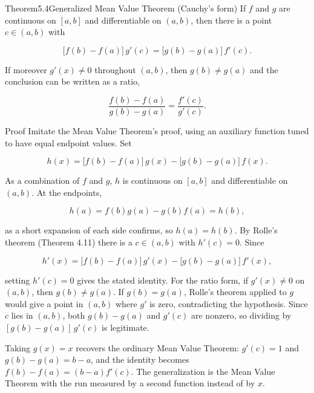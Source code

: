 \documentclass[a4paper,12pt,oneside]{memoir}
\begin{document}
\begin{envtheorem}{Theorem}{5.4}{Generalized Mean Value Theorem (Cauchy’s form)}
If \(f\) and \(g\) are continuous on \([a, b]\) and differentiable on \((a, b)\), then there is a point \(c \in (a, b)\) with

\[ \bigl[f(b) - f(a)\bigr]\,g'(c) = \bigl[g(b) - g(a)\bigr]\,f'(c). \]

If moreover \(g'(x) \ne 0\) throughout \((a, b)\), then \(g(b) \ne g(a)\) and the conclusion can be written as a ratio,

\[ \frac{f(b) - f(a)}{g(b) - g(a)} = \frac{f'(c)}{g'(c)}. \]
\end{envtheorem}
\begin{envproof}{Proof}{}{}
Imitate the Mean Value Theorem’s proof, using an auxiliary function tuned to have equal endpoint values. Set

\[ h(x) = \bigl[f(b) - f(a)\bigr]\,g(x) - \bigl[g(b) - g(a)\bigr]\,f(x). \]

As a combination of \(f\) and \(g\), \(h\) is continuous on \([a, b]\) and differentiable on \((a, b)\). At the endpoints,

\[ h(a) = f(b)g(a) - g(b)f(a) = h(b), \]

as a short expansion of each side confirms, so \(h(a) = h(b)\). By Rolle’s theorem (Theorem 4.11) there is a \(c \in (a, b)\) with \(h'(c) = 0\). Since

\[ h'(x) = \bigl[f(b) - f(a)\bigr]\,g'(x) - \bigl[g(b) - g(a)\bigr]\,f'(x), \]

setting \(h'(c) = 0\) gives the stated identity. For the ratio form, if \(g'(x) \ne 0\) on \((a, b)\), then \(g(b) \ne g(a)\). If \(g(b) = g(a)\), Rolle’s theorem applied to \(g\) would give a point in \((a, b)\) where \(g'\) is zero, contradicting the hypothesis. Since \(c\) lies in \((a, b)\), both \(g(b) - g(a)\) and \(g'(c)\) are nonzero, so dividing by \([g(b) - g(a)]\,g'(c)\) is legitimate. \qedmark
\end{envproof}
\begin{informal}
Taking \(g(x) = x\) recovers the ordinary Mean Value Theorem: \(g'(c) = 1\) and \(g(b) - g(a) = b - a\), and the identity becomes \(f(b) - f(a) = (b - a)f'(c)\). The generalization is the Mean Value Theorem with the run measured by a second function instead of by \(x\).
\end{informal}
\end{document}
